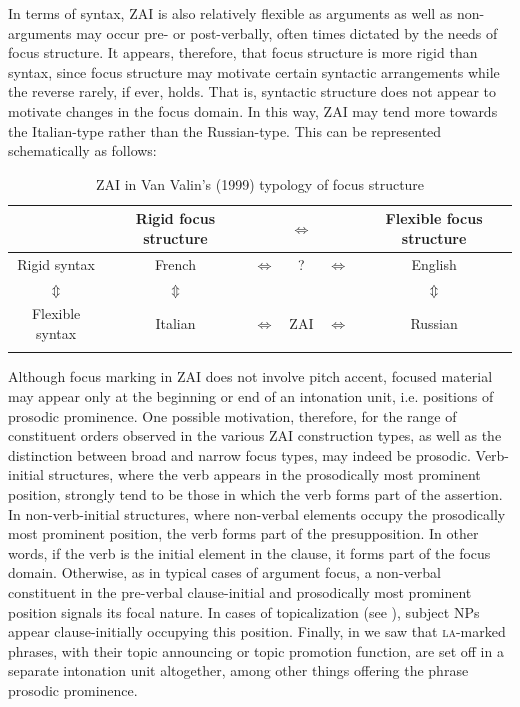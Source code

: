 In terms of syntax, ZAI is also relatively flexible as arguments as well as non-arguments may occur pre- or post-verbally, often times dictated by the needs of focus structure. It appears, therefore, that focus structure is more rigid than syntax, since focus structure may motivate certain syntactic arrangements while the reverse rarely, if ever, holds. That is, syntactic structure does not appear to motivate changes in the focus domain. In this way, ZAI may tend more towards the Italian-type rather than the Russian-type. This can be represented schematically as follows:

\begin{table}

\caption{{ZAI in Van Valin's (1999) typology of focus structure}}\label{zapfoctyp}
\begin{tabular}{c@{}c@{}c c c@{}c}
\lsptoprule
& Rigid focus structure & & $\Leftrightarrow$ & & Flexible focus structure  \\

\midrule
Rigid syntax & French & $\Leftrightarrow$ & ? & $\Leftrightarrow$ & English \\
$\Updownarrow$ &  $\Updownarrow$ & & & & $\Updownarrow$ \\
Flexible syntax & Italian & $\Leftrightarrow$ & ZAI & $\Leftrightarrow$ & Russian \\

\lspbottomrule
\end{tabular}

\end{table}

Although focus marking in ZAI does not involve pitch accent, focused material may appear only at the beginning or end of an intonation unit, i.e. positions of prosodic prominence. One possible motivation, therefore, for the range of constituent orders observed in the various ZAI construction types, as well as the distinction between broad and narrow focus types, may indeed be prosodic. Verb-initial structures, where the verb appears in the prosodically most prominent position, strongly tend to be those in which the verb forms part of the assertion. In non-verb-initial structures, where non-verbal elements occupy the prosodically most prominent position, the verb forms part of the presupposition. In other words, if the verb is the initial element in the clause, it forms part of the focus domain. Otherwise, as in typical cases of argument focus, a non-verbal constituent in the pre-verbal clause-initial and prosodically most prominent position signals its focal nature. In cases of topicalization (see ), subject NPs appear clause-initially occupying this position. Finally, in  we saw that \textsc{la}-marked phrases, with their topic announcing or topic promotion function, are set off in a separate intonation unit altogether, among other things offering the phrase prosodic prominence. 



